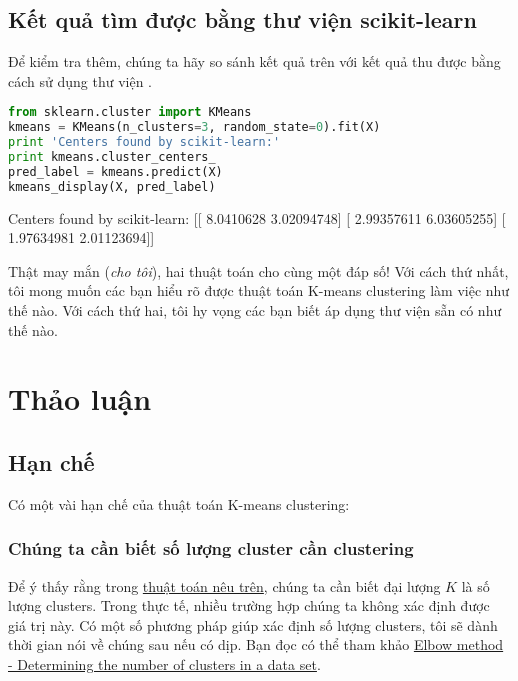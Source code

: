 \subsection{Kết quả tìm được bằng thư viện scikit-learn}
 
Để kiểm tra thêm, chúng ta hãy so sánh kết quả trên với kết quả thu được bằng cách sử dụng thư viện \href{http://scikit-learn.org/stable/modules/generated/sklearn.cluster.KMeans.html}{}. 
 
\begin{lstlisting}[language=Python]
from sklearn.cluster import KMeans 
kmeans = KMeans(n_clusters=3, random_state=0).fit(X) 
print 'Centers found by scikit-learn:' 
print kmeans.cluster_centers_ 
pred_label = kmeans.predict(X) 
kmeans_display(X, pred_label) 
\end{lstlisting}
 
    Centers found by scikit-learn: 
    [[ 8.0410628   3.02094748] 
     [ 2.99357611  6.03605255] 
     [ 1.97634981  2.01123694]] 
 
 
 
 
 
Thật may mắn (\textit{cho tôi}), hai thuật toán cho cùng một đáp số! Với cách thứ nhất, tôi mong muốn các bạn hiểu rõ được thuật toán K-means clustering làm việc như thế nào. Với cách thứ hai, tôi hy vọng các bạn biết áp dụng thư viện sẵn có như thế nào. 
 
 
\section{Thảo luận}
 
\subsection{Hạn chế}
Có một vài hạn chế của thuật toán K-means clustering: 
 
 
\subsubsection{Chúng ta cần biết số lượng cluster cần clustering}
Để ý thấy rằng trong \href{http://machinelearningcoban.com#tom-tat-thuat-toan}{thuật toán nêu trên}, chúng ta cần biết đại lượng $K$ là số lượng clusters. Trong thực tế, nhiều trường hợp chúng ta không xác định được giá trị này. Có một số phương pháp giúp xác định số lượng clusters, tôi sẽ dành thời gian nói về chúng sau nếu có dịp. Bạn đọc có thể tham khảo \href{https://en.wikipedia.org/wiki/Determining_the_number_of_clusters_in_a_data_set}{Elbow method - Determining the number of clusters in a data set}. 
 
